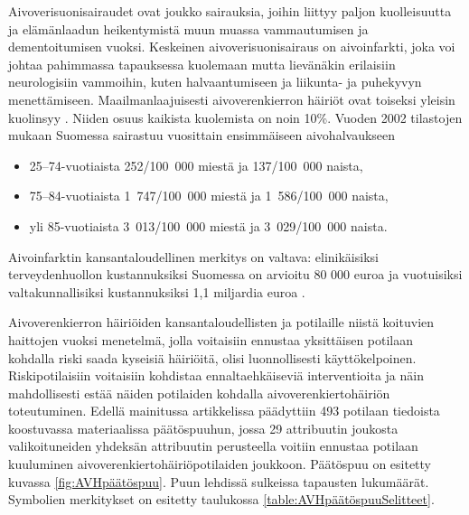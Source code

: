 \documentclass[12pt,finnish]{tktltiki2}
\theoremstyle{definition}
\theoremstyle{remark}
\begin{document}
Aivoverisuonisairaudet ovat joukko sairauksia, joihin liittyy paljon kuolleisuutta ja elämänlaadun heikentymistä
muun muassa vammautumisen ja dementoitumisen vuoksi. Keskeinen aivoverisuonisairaus on aivoinfarkti, joka
voi johtaa pahimmassa tapauksessa kuolemaan mutta lievänäkin erilaisiin neurologisiin vammoihin, kuten
halvaantumiseen ja liikunta- ja puhekyvyn menettämiseen. Maailmanlaajuisesti aivoverenkierron häiriöt ovat toiseksi yleisin
kuolinsyy \cite{burdenOfDisease}. Niiden osuus kaikista kuolemista on noin 10\%. Vuoden 2002 tilastojen mukaan
\cite{aivohalvaustenIlmaantuvuusSuomessa19912002} Suomessa sairastuu vuosittain ensimmäiseen aivohalvaukseen
\begin{itemize}
  \item 25–74-vuotiaista 252/100~000 miestä ja 137/100~000 naista,
  \item 75–84-vuotiaista 1~747/100~000 miestä ja 1~586/100~000 naista,
  \item yli 85-vuotiaista 3~013/100~000 miestä ja 3~029/100~000 naista.
\end{itemize}
Aivoinfarktin kansantaloudellinen merkitys on valtava: elinikäisiksi terveydenhuollon kustannuksiksi
Suomessa on arvioitu 80 000 euroa ja vuotuisiksi valtakunnallisiksi kustannuksiksi 1,1 miljardia euroa
\cite{aivoinfarktinKustannuksetTHL}.

Aivoverenkierron häiriöiden kansantaloudellisten ja potilaille niistä koituvien haittojen vuoksi
menetelmä, jolla voitaisiin ennustaa yksittäisen potilaan kohdalla riski saada kyseisiä häiriöitä,
olisi luonnollisesti käyttökelpoinen. Riskipotilaisiin voitaisiin kohdistaa ennaltaehkäiseviä
interventioita ja näin mahdollisesti estää näiden potilaiden kohdalla aivoverenkiertohäiriön
toteutuminen. Edellä mainitussa artikkelissa \cite{predictiveModelCerebrovascularDisease}
päädyttiin 493 potilaan tiedoista koostuvassa materiaalissa päätöspuuhun, jossa 29 attribuutin joukosta
valikoituneiden yhdeksän attribuutin perusteella voitiin ennustaa potilaan kuuluminen
aivoverenkiertohäiriöpotilaiden joukkoon. Päätöspuu on esitetty kuvassa \ref{fig:AVHpäätöspuu}.
Puun lehdissä sulkeissa tapausten lukumäärät. Symbolien merkitykset on esitetty taulukossa 
\ref{table:AVHpäätöspuuSelitteet}.
\end{document}
